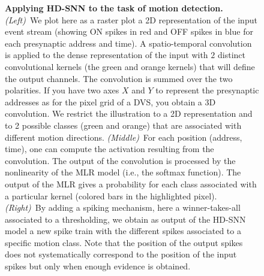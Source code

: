 \documentclass[landscape,a0]{a0poster}
\begin{document}
\begin{multicols}{3}
\begin{figure}[H]
{    \textbf{Applying HD-SNN to the task of motion detection.} \textit{(Left)}~We plot here as a raster plot a 2D representation of the input event stream (showing ON spikes in red and OFF spikes in blue for each presynaptic address and time). A spatio-temporal convolution is applied to the dense representation of the input with $2$ distinct convolutional kernels (the green and orange kernels) that will define the output channels. The convolution is summed over the two polarities. If you have two axes $X$ and $Y$ to represent the presynaptic addresses as for the pixel grid of a DVS, you obtain a 3D convolution. We restrict the illustration to a 2D representation and to 2 possible classes (green and orange) that are associated with different motion directions. \textit{(Middle)}~For each position (address, time), one can compute the activation resulting from the convolution. The output of the convolution is processed by the nonlinearity of the MLR model (i.e., the softmax function). The output of the MLR gives a probability for each class associated with a particular kernel (colored bars in the highlighted pixel). \textit{(Right)}~By adding a spiking mechanism, here a winner-takes-all associated to a thresholding, we obtain as output of the HD-SNN model a new spike train with the different spikes associated to a specific motion class. Note that the position of the output spikes does not systematically correspond to the position of the input spikes but only when enough evidence is obtained.}
    \label{fig:model}
\end{figure}

\end{multicols}
\end{document}
